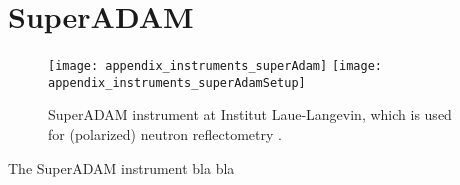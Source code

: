 \documentclass[\main/dresen_thesis.tex]{subfiles}
\begin{document}
  \section{SuperADAM}\label{ch:lss:superadam}
    \begin{figure}[ht]
      \centering
      \texttt{[image: appendix\_instruments\_superAdam]}
      \texttt{[image: appendix\_instruments\_superAdamSetup]}
      \caption{\label{fig:lss:superadam}SuperADAM instrument at Institut Laue-Langevin, which is used for (polarized) neutron reflectometry \cite{Devishvili_2015_Super}.}
    \end{figure}
    The SuperADAM instrument bla bla
\end{document}
